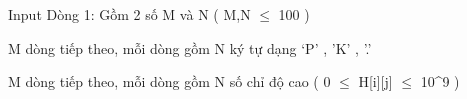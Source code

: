Input
Dòng 1: Gồm 2 số M và N ( M,N  $\le$  100 )

M dòng tiếp theo, mỗi dòng gồm N ký tự dạng ‘P’ , ’K’ , ’.’

M dòng tiếp theo, mỗi dòng gồm N số chỉ độ cao ( 0  $\le$  H[i][j]  $\le$  10^9 )